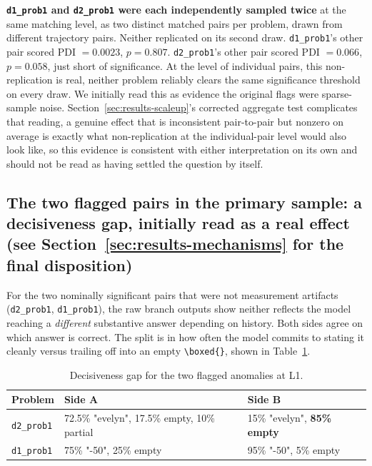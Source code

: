 \documentclass{article}
\begin{document}
\textbf{\texttt{d1\_prob1} and \texttt{d2\_prob1} were each independently sampled twice} at the same matching level, as two distinct matched pairs per problem, drawn from different trajectory pairs. Neither replicated on its second draw. \texttt{d1\_prob1}'s other pair scored PDI $=0.0023$, $p=0.807$. \texttt{d2\_prob1}'s other pair scored PDI $=0.066$, $p=0.058$, just short of significance. At the level of individual pairs, this non-replication is real, neither problem reliably clears the same significance threshold on every draw. We initially read this as evidence the original flags were sparse-sample noise. Section~\ref{sec:results-scaleup}'s corrected aggregate test complicates that reading, a genuine effect that is inconsistent pair-to-pair but nonzero on average is exactly what non-replication at the individual-pair level would also look like, so this evidence is consistent with either interpretation on its own and should not be read as having settled the question by itself.

\subsection{The two flagged pairs in the primary sample: a decisiveness gap, initially read as a real effect (see Section~\ref{sec:results-mechanisms} for the final disposition)}
\label{sec:results-flagged}

For the two nominally significant pairs that were not measurement artifacts (\texttt{d2\_prob1}, \texttt{d1\_prob1}), the raw branch outputs show neither reflects the model reaching a \emph{different} substantive answer depending on history. Both sides agree on which answer is correct. The split is in how often the model commits to stating it cleanly versus trailing off into an empty \texttt{\textbackslash boxed\{\}}, shown in Table~\ref{tab:decisive}.

\begin{table}[h]
\centering
\caption{Decisiveness gap for the two flagged anomalies at L1.}
\label{tab:decisive}
\begin{tabular}{lll}
\toprule
Problem & Side A & Side B \\
\midrule
\texttt{d2\_prob1} & 72.5\% "evelyn", 17.5\% empty, 10\% partial & 15\% "evelyn", \textbf{85\% empty} \\
\texttt{d1\_prob1} & 75\% "-50", 25\% empty & 95\% "-50", 5\% empty \\
\bottomrule
\end{tabular}
\end{table}
\end{document}
